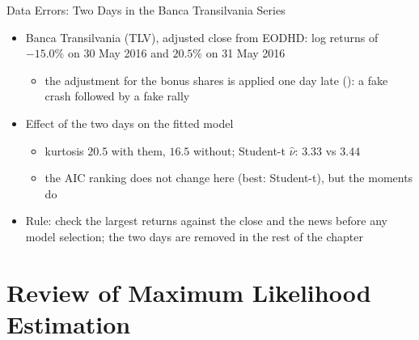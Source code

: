 \begin{frame}{Data Errors: Two Days in the Banca Transilvania Series}
\itemsize{\small}
\begin{itemize}
    \item Banca Transilvania (TLV), adjusted close from EODHD: log returns of $-15.0\%$ on 30 May 2016 and $20.5\%$ on 31 May 2016
    \begin{itemize}
        \item the adjustment for the bonus shares is applied one day late (): a fake crash followed by a fake rally
    \end{itemize}
    \item Effect of the two days on the fitted model
    \begin{itemize}
        \item kurtosis $20.5$ with them, $16.5$ without; Student-t $\hat\nu$: $3.33$ vs $3.44$
        \item the AIC ranking does not change here (best: Student-t), but the moments do
    \end{itemize}
    \item Rule: check the largest returns against the close and the news before any model selection; the two days are removed in the rest of the chapter
\end{itemize}
\end{frame}


\section{Review of Maximum Likelihood Estimation}

